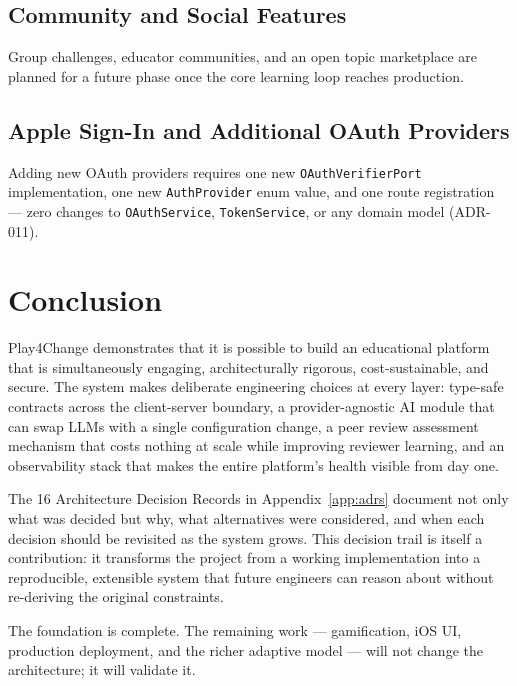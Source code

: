 \subsection{Community and Social Features}
Group challenges, educator communities, and an open topic marketplace are planned for a future phase once the core learning loop reaches production.

\subsection{Apple Sign-In and Additional OAuth Providers}
Adding new OAuth providers requires one new \texttt{OAuthVerifierPort} implementation, one new \texttt{AuthProvider} enum value, and one route registration — zero changes to \texttt{OAuthService}, \texttt{TokenService}, or any domain model (ADR-011).

\section{Conclusion}
\label{sec:conclusion}

Play4Change demonstrates that it is possible to build an educational platform that is simultaneously engaging, architecturally rigorous, cost-sustainable, and secure. The system makes deliberate engineering choices at every layer: type-safe contracts across the client-server boundary, a provider-agnostic AI module that can swap LLMs with a single configuration change, a peer review assessment mechanism that costs nothing at scale while improving reviewer learning, and an observability stack that makes the entire platform's health visible from day one.

The 16 Architecture Decision Records in Appendix~\ref{app:adrs} document not only what was decided but why, what alternatives were considered, and when each decision should be revisited as the system grows. This decision trail is itself a contribution: it transforms the project from a working implementation into a reproducible, extensible system that future engineers can reason about without re-deriving the original constraints.

The foundation is complete. The remaining work — gamification, iOS UI, production deployment, and the richer adaptive model — will not change the architecture; it will validate it.

